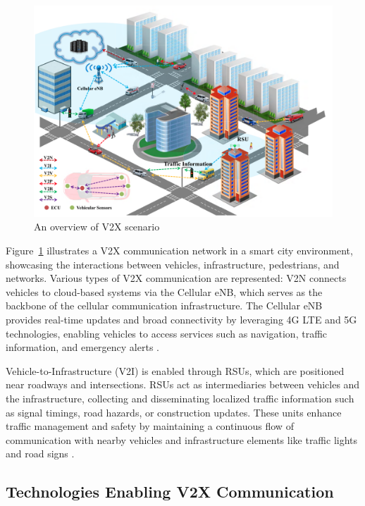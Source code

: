  \begin{figure}[H]
    \centering
    \includegraphics[width=1\textwidth]{images/figure1.png}
    \caption{An overview of V2X scenario}
    \label{fig:fig1}
\end{figure}

Figure~\ref{fig:fig1} illustrates a V2X communication network in a smart city environment, showcasing the interactions between
 vehicles, infrastructure, pedestrians, and networks. Various types of V2X communication are represented:
  \ac{V2N} connects vehicles to cloud-based systems via the Cellular \ac{eNB},
   which serves as the backbone of the cellular communication infrastructure. The Cellular eNB provides real-time updates
    and broad connectivity by leveraging 4G LTE and 5G technologies, enabling vehicles to access services such as navigation, 
    traffic information, and emergency alerts \cite{cite-key}. 

Vehicle-to-Infrastructure (V2I) is enabled through \ac{RSUs}, which are positioned near roadways 
and intersections. RSUs act as intermediaries between vehicles and the infrastructure, collecting and disseminating
 localized traffic information such as signal timings, road hazards, or construction updates. These units enhance 
 traffic management and safety by maintaining a continuous flow of communication with nearby vehicles and infrastructure 
 elements like traffic lights and road signs \cite{10806826}. 
    

 \subsection{Technologies Enabling V2X Communication}

